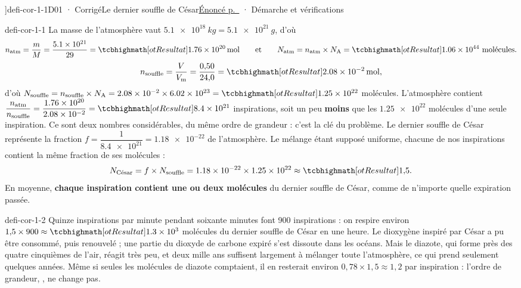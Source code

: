 \editionPage[\pdfbookmark[0]{Corrigés des défis}{bm-corriges-defis}]{defi-cor-1-1}{D01 · Corrigé}{Le dernier souffle de César}{\hyperref[defi-ex-1]{Énoncé p.~\pageref*{defi-ex-1}} · Démarche et vérifications}
\begin{blocEdition}{defi-cor-1-1}
La masse de l'atmosphère vaut $\qty{5,1e18}{kg}=\qty{5,1e21}{g}$, d'où
\[n_\text{atm}=\frac{m}{M}=\frac{\num{5.1e21}}{29}=\res{\qty{1,76e20}{mol}}\qquad\text{et}\qquad N_\text{atm}=n_\text{atm}\times N_\mathrm{A}=\res{\num{1.06e44}}\ \text{molécules}.\]
\[n_\text{souffle}=\frac{V}{V_\mathrm{m}}=\frac{0{,}50}{24{,}0}=\res{\qty{2,08e-2}{mol}},\]
d'où $N_\text{souffle}=n_\text{souffle}\times N_\mathrm{A}=\num{2.08e-2}\times\num{6.02e23}=\res{\num{1.25e22}}$ molécules.
L'atmosphère contient $\dfrac{n_\text{atm}}{n_\text{souffle}}=\dfrac{\num{1.76e20}}{\num{2.08e-2}}=\res{\num{8.4e21}}$ inspirations, soit un peu \textbf{moins} que les
$\num{1.25e22}$ molécules d'une seule inspiration. Ce sont deux nombres considérables, du même ordre de grandeur : c'est
la clé du problème.
Le dernier souffle de César représente la fraction $f=\dfrac{1}{\num{8.4e21}}=\num{1.18e-22}$ de l'atmosphère. Le mélange étant supposé
uniforme, chacune de nos inspirations contient la même fraction de ses molécules :
\[N_\text{César}=f\times N_\text{souffle}=\num{1.18e-22}\times\num{1.25e22}\approx\res{1{,}5}.\]
En moyenne, \textbf{chaque inspiration contient une ou deux molécules} du dernier souffle de César, comme de n'importe
quelle expiration passée.
\end{blocEdition}

\begin{blocEdition}{defi-cor-1-2}
\label{figedition-defi-cor-1-2-1}
Quinze inspirations par minute pendant soixante minutes font 900 inspirations : on respire environ
$1{,}5\times900\approx\res{\num{1.3e3}}$ molécules du dernier souffle de César en une heure.
Le dioxygène inspiré par César a pu être consommé, puis renouvelé ; une partie du dioxyde de carbone expiré s'est
dissoute dans les océans. Mais le diazote, qui forme près des quatre cinquièmes de l'air, réagit très peu, et
deux mille ans suffisent largement à mélanger toute l'atmosphère, ce qui prend seulement quelques années. Même si
seules les molécules de diazote comptaient, il en resterait environ $0{,}78\times1{,}5\approx1{,}2$ par inspiration : l'ordre de
grandeur, , ne change pas.
\end{blocEdition}

